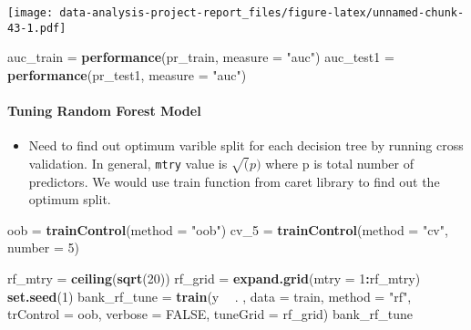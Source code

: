 \documentclass[
]{article}
\newenvironment{Shaded}{\begin{snugshade}}{\end{snugshade}}
\newcommand{\DataTypeTok}[1]{\textcolor[rgb]{0.13,0.29,0.53}{#1}}
\newcommand{\DecValTok}[1]{\textcolor[rgb]{0.00,0.00,0.81}{#1}}
\newcommand{\KeywordTok}[1]{\textcolor[rgb]{0.13,0.29,0.53}{\textbf{#1}}}
\newcommand{\NormalTok}[1]{#1}
\newcommand{\OperatorTok}[1]{\textcolor[rgb]{0.81,0.36,0.00}{\textbf{#1}}}
\newcommand{\OtherTok}[1]{\textcolor[rgb]{0.56,0.35,0.01}{#1}}
\newcommand{\StringTok}[1]{\textcolor[rgb]{0.31,0.60,0.02}{#1}}
\providecommand{\tightlist}{%
  \setlength{\itemsep}{0pt}\setlength{\parskip}{0pt}}
\begin{document}
\texttt{[image: data-analysis-project-report\_files/figure-latex/unnamed-chunk-43-1.pdf]}

\begin{Shaded}
\begin{Highlighting}[]
\NormalTok{auc_train =}\StringTok{ }\KeywordTok{performance}\NormalTok{(pr_train, }\DataTypeTok{measure =} \StringTok{"auc"}\NormalTok{)}
\NormalTok{auc_test1 =}\StringTok{ }\KeywordTok{performance}\NormalTok{(pr_test1, }\DataTypeTok{measure =} \StringTok{"auc"}\NormalTok{)}
\end{Highlighting}
\end{Shaded}

\hypertarget{tuning-random-forest-model}{%
\paragraph{Tuning Random Forest
Model}\label{tuning-random-forest-model}}

\begin{itemize}
\tightlist
\item
  Need to find out optimum varible split for each decision tree by
  running cross validation. In general, \texttt{mtry} value is
  \(\sqrt(p)\) where p is total number of predictors. We would use train
  function from caret library to find out the optimum split.
\end{itemize}

\begin{Shaded}
\begin{Highlighting}[]
\NormalTok{oob =}\StringTok{ }\KeywordTok{trainControl}\NormalTok{(}\DataTypeTok{method =} \StringTok{"oob"}\NormalTok{)}
\NormalTok{cv_}\DecValTok{5}\NormalTok{ =}\StringTok{ }\KeywordTok{trainControl}\NormalTok{(}\DataTypeTok{method =} \StringTok{"cv"}\NormalTok{, }\DataTypeTok{number =} \DecValTok{5}\NormalTok{)}

\NormalTok{rf_mtry =}\StringTok{ }\KeywordTok{ceiling}\NormalTok{(}\KeywordTok{sqrt}\NormalTok{(}\DecValTok{20}\NormalTok{))}
\NormalTok{rf_grid =}\StringTok{  }\KeywordTok{expand.grid}\NormalTok{(}\DataTypeTok{mtry =} \DecValTok{1}\OperatorTok{:}\NormalTok{rf_mtry)}
\KeywordTok{set.seed}\NormalTok{(}\DecValTok{1}\NormalTok{)}
\NormalTok{bank_rf_tune =}\StringTok{ }\KeywordTok{train}\NormalTok{(y }\OperatorTok{~}\StringTok{ }\NormalTok{. , }\DataTypeTok{data =}\NormalTok{ train,}
                     \DataTypeTok{method =} \StringTok{"rf"}\NormalTok{,}
                     \DataTypeTok{trControl =}\NormalTok{ oob,}
                     \DataTypeTok{verbose =} \OtherTok{FALSE}\NormalTok{,}
                     \DataTypeTok{tuneGrid =}\NormalTok{ rf_grid)}
\NormalTok{bank_rf_tune}
\end{Highlighting}
\end{Shaded}
\end{document}
